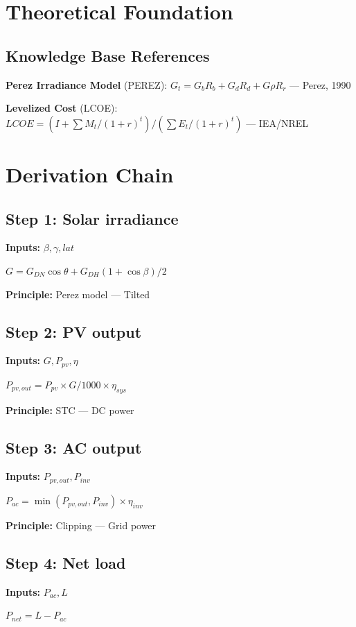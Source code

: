 \documentclass[11pt,twocolumn]{article}
\begin{document}
\section{Theoretical Foundation}

\subsection{Knowledge Base References}
\textbf{Perez Irradiance Model} (PEREZ): $G_t = G_b R_b + G_d R_d + G\rho R_r$ --- Perez, 1990

\textbf{Levelized Cost} (LCOE): $LCOE = (I + \sum M_t/(1+r)^t)/(\sum E_t/(1+r)^t)$ --- IEA/NREL


\section{Derivation Chain}

\subsection*{Step 1: Solar irradiance}
\textbf{Inputs:} $\beta, \gamma, lat$

$G = G_{DN}\cos\theta + G_{DH}(1+\cos\beta)/2$

\textbf{Principle:} Perez model --- Tilted

\subsection*{Step 2: PV output}
\textbf{Inputs:} $G, P_{pv}, \eta$

$P_{pv,out} = P_{pv} \times G/1000 \times \eta_{sys}$

\textbf{Principle:} STC --- DC power

\subsection*{Step 3: AC output}
\textbf{Inputs:} $P_{pv,out}, P_{inv}$

$P_{ac} = \min(P_{pv,out}, P_{inv}) \times \eta_{inv}$

\textbf{Principle:} Clipping --- Grid power

\subsection*{Step 4: Net load}
\textbf{Inputs:} $P_{ac}, L$

$P_{net} = L - P_{ac}$
\end{document}
